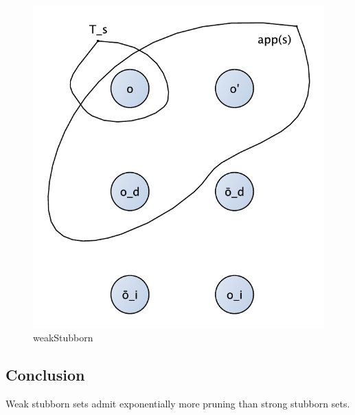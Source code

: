 \documentclass[11pt,a4paper]{article}
\begin{document}
\begin{figure}[h!]
\centering
\includegraphics[scale=0.4]{weakStubborn}
\caption{weakStubborn}
\end{figure}

\subsection*{Conclusion}
Weak stubborn sets admit exponentially more pruning than strong stubborn sets.

\label{lastpage}
\end{document}
